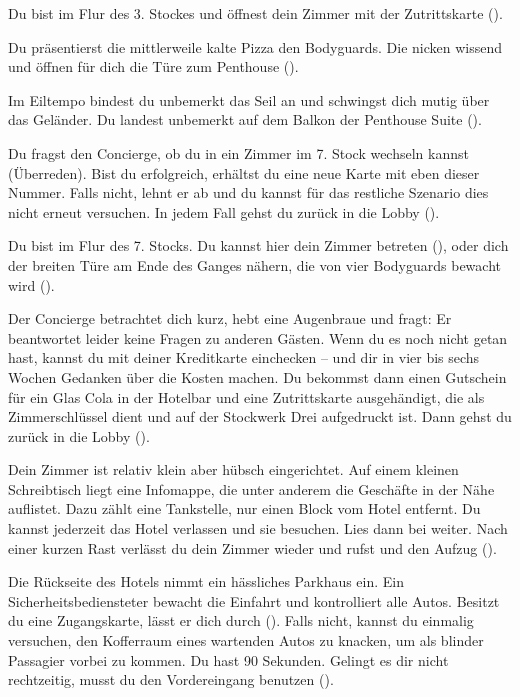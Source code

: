 {	%
	 Du bist im Flur des 3. Stockes und öffnest dein Zimmer mit der Zutrittskarte ().

	 Du präsentierst die mittlerweile kalte Pizza den Bodyguards. Die nicken wissend und öffnen für dich die Türe zum Penthouse ().

		 Im Eiltempo bindest du unbemerkt das Seil an und schwingst dich mutig über das Geländer. Du landest unbemerkt auf dem Balkon der Penthouse Suite ().

	 Du fragst den Concierge, ob du in ein Zimmer im 7. Stock wechseln kannst  (Überreden). Bist du erfolgreich, erhältst du eine neue Karte mit eben dieser Nummer. Falls nicht, lehnt er ab und du kannst für das restliche Szenario dies nicht erneut versuchen. In jedem Fall gehst du zurück in die Lobby ().

	 Du bist im Flur des 7. Stocks. Du kannst hier dein Zimmer betreten (), oder dich der breiten Türe am Ende des Ganges nähern, die von vier Bodyguards bewacht wird ().

	 Der Concierge betrachtet dich kurz, hebt eine Augenbraue und fragt:  Er beantwortet leider keine Fragen zu anderen Gästen. Wenn du es noch nicht getan hast, kannst du mit deiner Kreditkarte einchecken -- und dir in vier bis sechs Wochen Gedanken über die Kosten machen. Du bekommst dann einen Gutschein für ein Glas Cola in der Hotelbar und eine Zutrittskarte ausgehändigt, die als Zimmerschlüssel dient und auf der Stockwerk Drei aufgedruckt ist. Dann gehst du zurück in die Lobby ().

		 Dein Zimmer ist relativ klein aber hübsch eingerichtet. Auf einem kleinen Schreibtisch liegt eine Infomappe, die unter anderem die Geschäfte in der Nähe auflistet. Dazu zählt eine Tankstelle, nur einen Block vom Hotel entfernt. Du kannst jederzeit das Hotel verlassen und sie besuchen. Lies dann bei  weiter. Nach einer kurzen Rast verlässt du dein Zimmer wieder und rufst und den Aufzug ().

		 Die Rückseite des Hotels nimmt ein hässliches Parkhaus ein. Ein Sicherheitsbediensteter bewacht die Einfahrt und kontrolliert alle Autos. Besitzt du eine Zugangskarte, lässt er dich durch (). Falls nicht, kannst du einmalig versuchen, den Kofferraum eines wartenden Autos zu knacken, um als blinder Passagier vorbei zu kommen. Du hast 90 Sekunden. Gelingt es dir nicht rechtzeitig, musst du den Vordereingang benutzen ().

}
